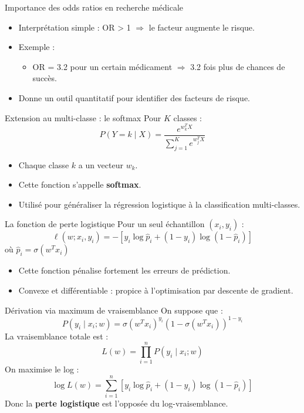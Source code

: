 \documentclass[aspectratio=169,12pt]{beamer}
\begin{document}
\begin{frame}{Importance des odds ratios en recherche médicale}
\begin{itemize}
  \item Interprétation simple : OR > 1 $\Rightarrow$ le facteur augmente le risque.
  \item Exemple :
  \begin{itemize}
    \item OR = 3.2 pour un certain médicament $\Rightarrow$ 3.2 fois plus de chances de succès.
  \end{itemize}
  \item Donne un outil quantitatif pour identifier des facteurs de risque.
\end{itemize}
\end{frame}

\begin{frame}{Extension au multi-classe : le softmax}
Pour $K$ classes :
\[
P(Y = k \mid X) = \frac{e^{w_k^T X}}{\sum_{j=1}^K e^{w_j^T X}}
\]
\begin{itemize}
  \item Chaque classe $k$ a un vecteur $w_k$.
  \item Cette fonction s’appelle \textbf{softmax}.
  \item Utilisé pour généraliser la régression logistique à la classification multi-classes.
\end{itemize}
\end{frame}

\begin{frame}{La fonction de perte logistique}
Pour un seul échantillon $(x_i, y_i)$ :
\[
\ell(w; x_i, y_i) = -\left[ y_i \log \hat{p}_i + (1 - y_i) \log (1 - \hat{p}_i) \right]
\]
où $\hat{p}_i = \sigma(w^T x_i)$

\begin{itemize}
  \item Cette fonction pénalise fortement les erreurs de prédiction.
  \item Convexe et différentiable : propice à l’optimisation par descente de gradient.
\end{itemize}
\end{frame}

\begin{frame}{Dérivation via maximum de vraisemblance}
On suppose que :
\[
P(y_i \mid x_i; w) = \sigma(w^T x_i)^{y_i} (1 - \sigma(w^T x_i))^{1 - y_i}
\]
La vraisemblance totale est :
\[
L(w) = \prod_{i=1}^n P(y_i \mid x_i; w)
\]
On maximise le log :
\[
\log L(w) = \sum_{i=1}^n \left[ y_i \log \hat{p}_i + (1 - y_i) \log (1 - \hat{p}_i) \right]
\]
Donc la \textbf{perte logistique} est l’opposée du log-vraisemblance.
\end{frame}
\end{document}
